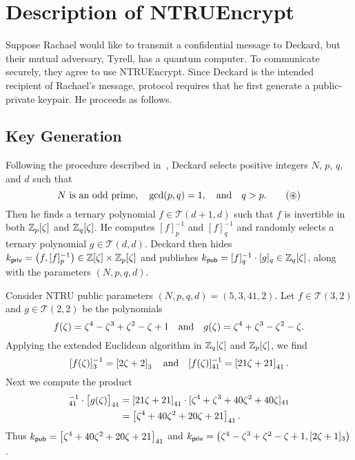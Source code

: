 \documentclass[10pt,reqno]{article}
\begin{document}
\section{Description of \textnormal{\textsf{NTRUEncrypt}}}
Suppose Rachael would like to transmit a confidential message to Deckard, but their mutual adversary, Tyrell, has a quantum computer. To communicate securely, they agree to use \textsf{NTRUEncrypt}. Since Deckard is the intended recipient of Rachael's message, protocol requires that he first generate a public-private keypair. He proceeds as follows. 
\subsection{Key Generation}\label{subsec:keygen}
Following the procedure described in~\cite{Hoffstein98ntru:a}, Deckard selects positive integers $N$, $p$, $q$, and $d$ such that
\hypertarget{star}{\begin{equation}
N \ \textnormal{is an odd prime,} \quad \gcd(p,q)=1, \quad \textnormal{and} \quad q>p.  \tag{$\circledast$}\end{equation}}
Then he finds a ternary polynomial $f \in \mathcal{T}(d+1,d)$ such that $f$ is invertible in both $\mathbb{Z}_p[\zeta]$ and $\mathbb{Z}_q[\zeta]$. He computes $[f]_p^{-1}$ and $[f]_q^{-1}$ and randomly selects a ternary polynomial $g \in \mathcal{T}(d,d)$. Deckard then hides $k_{\sf{priv}}=\left(f,[f]_p^{-1} \right) \in \mathbb{Z}[\zeta] \times \mathbb{Z}_p[\zeta]$ and publishes $k_{\sf{pub}}= [f]_q^{-1} \cdot [g]_q \in \mathbb{Z}_q[\zeta]$, along with the parameters $(N,p,q,d)$.


\begin{example}\label{ex:keygen}
Consider NTRU public parameters $(N,p,q,d)=(5,3,41,2)$. Let $f \in \mathcal{T}(3,2)$ and $g \in \mathcal{T}(2,2)$ be the polynomials
    \[f(\zeta)=\zeta^4-\zeta^3+\zeta^2-\zeta+1 \quad \textnormal{and} \quad g(\zeta)=\zeta^4+\zeta^3-\zeta^2-\zeta.\]
    Applying the extended Euclidean algorithm in $\mathbb{Z}_q[\zeta]$ and $\mathbb{Z}_p[\zeta]$, we find 
    \[[f(\zeta)]_3^{-1} = \left[{2\zeta+2}\right]_{{3}} \quad \textnormal{and} \quad [f(\zeta)]_{41}^{-1} = \left[{21\zeta+21}\right]_{{41}}.\]
Next we compute the product
    \begin{align*}
        [f(\zeta)]_{41}^{-1} \cdot \big[g(\zeta)\big]_{41} &=  \left[21\zeta+21\right]_{41}\cdot [\zeta^4+\zeta^3+40\zeta^2+40\zeta]_{41}
        \\&= \eq{\zeta^4+40\zeta^2+20\zeta+21}{41}.
    \end{align*}
    Thus $k_{\sf{pub}} = \left[{\zeta^4+40\zeta^2+20\zeta+21}\right]_{{41}}$ and $k_{\sf{priv}} = \left(\zeta^4-\zeta^3+\zeta^2-\zeta+1, [2\zeta+1]_3 \right)$.
    \[\]
\end{example}
\end{document}
